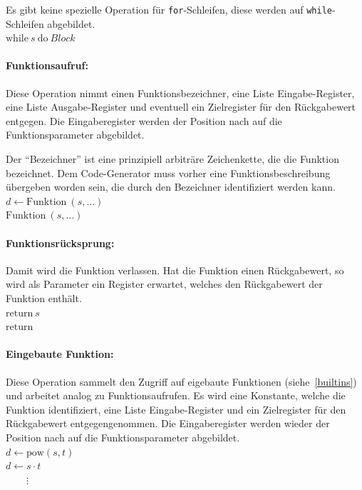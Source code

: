 \documentclass[twoside,a4paper,fleqn,12pt]{article}
\begin{document}
Es gibt keine spezielle Operation für \texttt{for}-Schleifen, diese werden auf \texttt{while}-Schleifen abgebildet.
\\\hspace*{1cm}$\mathrm{while}\ s\ \mathrm{do}\ \mathit{Block}$

\paragraph{Funktionsaufruf:} Diese Operation nimmt einen Funktionsbezeichner, eine Liste Eingabe-Register, eine Liste Ausgabe-Register
und eventuell ein Zielregister für den Rückgabewert entgegen. Die Eingaberegister werden der Position nach auf die Funktionsparameter abgebildet.

Der "`Bezeichner"' ist eine prinzipiell arbiträre Zeichenkette, die die Funktion bezeichnet. Dem Code-Generator muss
vorher eine Funktionsbeschreibung übergeben worden sein, die durch den Bezeichner identifiziert werden kann.
\\\hspace*{1cm}$d \gets \mathrm{Funktion}\ (s, \dots)$
\\\hspace*{1cm}$\mathrm{Funktion}\ (s, \dots)$

\paragraph{Funktionsrücksprung:} Damit wird die Funktion verlassen. Hat die Funktion einen Rückgabewert, so wird als Parameter ein Register
erwartet, welches den Rückgabewert der Funktion enthält.
\\\hspace*{1cm}$\mathrm{return}\ s$
\\\hspace*{1cm}$\mathrm{return}$

\paragraph{Eingebaute Funktion:} Diese Operation sammelt den Zugriff auf eigebaute Funktionen (siehe~\ref{builtins})
und arbeitet analog zu Funktionsaufrufen. Es wird eine Konstante, welche die Funktion identifiziert, eine Liste Eingabe-Register 
und ein Zielregister für den Rückgabewert entgegengenommen. Die Eingaberegister werden wieder der Position nach auf die Funktionsparameter abgebildet.
\\\hspace*{1cm}$d \gets \mathrm{pow}(s, t)$
\\\hspace*{1cm}$d \gets s \cdot t$
\\\hspace*{1cm}$\phantom{d \gets}\vdots$
\end{document}
